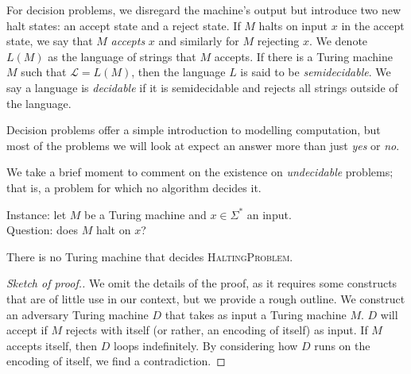 For decision problems, we disregard the machine's output but introduce two new halt states: an accept state and a reject state. If $M$ halts on input $x$ in the accept state, we say that $M$ \emph{accepts} $x$ and similarly for $M$ rejecting $x$. We denote $L(M)$ as the language of strings that $M$ accepts. If there is a Turing machine $M$ such that $\mathcal L = L(M)$, then the language $L$ is said to be \emph{semidecidable}. We say a language is \emph{decidable} if it is semidecidable and rejects all strings outside of the language.

Decision problems offer a simple introduction to modelling computation, but most of the problems we will look at expect an answer more than just \emph{yes} or \emph{no}.


We take a brief moment to comment on the existence on \emph{undecidable} problems; that is, a problem for which no algorithm decides it. 

\begin{problem}[HaltingProblem]
    Instance: let $M$ be a Turing machine and $x \in \Sigma^*$ an input. \\
    Question: does $M$ halt on $x$?
\end{problem}

\begin{theorem}
    There is no Turing machine that decides \textsc{HaltingProblem}.
\end{theorem}

\begin{proof}[Sketch of proof.]
    We omit the details of the proof, as it requires some constructs that are of little use in our context, but we provide a rough outline. We construct an adversary Turing machine $D$ that takes as input a Turing machine $M$. $D$ will accept if $M$ rejects with itself (or rather, an encoding of itself) as input. If $M$ accepts itself, then $D$ loops indefinitely. By considering how $D$ runs on the encoding of itself, we find a contradiction.
\end{proof}

